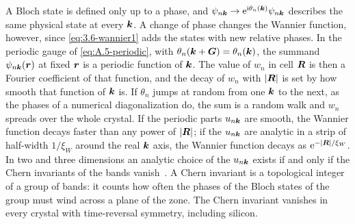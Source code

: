 A Bloch state is defined only up to a phase, and $\psi_{n\bm{k}} \to \mathrm{e}^{\mathrm{i}\theta_n(\bm{k})}\psi_{n\bm{k}}$ describes the same physical state at every $\bm{k}$. A change of phase changes the Wannier function, however, since \cref{eq:3.6-wannier1} adds the states with new relative phases. In the periodic gauge of \cref{eq:A.5-periodic}, with $\theta_n(\bm{k} + \bm{G}) = \theta_n(\bm{k})$, the summand $\psi_{n\bm{k}}(\bm{r})$ at fixed $\bm{r}$ is a periodic function of $\bm{k}$. The value of $w_n$ in cell $\bm{R}$ is then a Fourier coefficient of that function, and the decay of $w_n$ with $|\bm{R}|$ is set by how smooth that function of $\bm{k}$ is. If $\theta_n$ jumps at random from one $\bm{k}$ to the next, as the phases of a numerical diagonalization do, the sum is a random walk and $w_n$ spreads over the whole crystal. If the periodic parts $u_{n\bm{k}}$ are smooth, the Wannier function decays faster than any power of $|\bm{R}|$; if the $u_{n\bm{k}}$ are analytic in a strip of half-width $1/\xi_W$ around the real $\bm{k}$ axis, the Wannier function decays as $\mathrm{e}^{-|\bm{R}|/\xi_W}$. In two and three dimensions an analytic choice of the $u_{n\bm{k}}$ exists if and only if the Chern invariants of the bands vanish~\cite{brouder2007exponential}. A Chern invariant is a topological integer of a group of bands: it counts how often the phases of the Bloch states of the group must wind across a plane of the zone. The Chern invariant vanishes in every crystal with time-reversal symmetry, including silicon.

